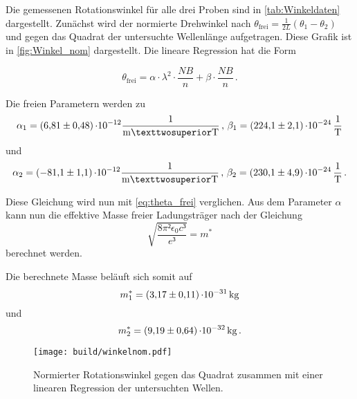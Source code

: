 Die gemessenen Rotationswinkel für alle drei Proben sind in \autoref{tab:Winkeldaten} dargestellt.
Zunächst wird der normierte Drehwinkel nach  $\theta_{\text{frei}} = \frac{1}{2 L}\left(\theta_1 - \theta_2\right)$ 
und gegen das Quadrat der untersuchte Wellenlänge aufgetragen.
Diese Grafik ist in \autoref{fig:Winkel_nom} dargestellt. 
Die lineare Regression hat die Form

\begin{equation*}
    \theta_{\text{frei}} = \alpha \cdot \lambda^2 \cdot \frac{N B}{n} + \beta \cdot \frac{N B}{n}\, .
\end{equation*}

Die freien Parametern werden zu %
\begin{equation*}
    \alpha_1 = \SI{6.81 \pm 0.48}\cdot 10^{-12} \unit{\frac{1}{\meter²\tesla}} \,, \, \beta_1 = \SI{224.1 \pm 2.1}\cdot 10^{-24} \, \unit{\frac{1}{\tesla}} \\ 
\end{equation*}
und
\begin{equation*}
    \alpha_2 = \SI{-81.1 \pm 1.1}\cdot 10^{-12} \unit{\frac{1}{\meter²\tesla}} \,, \,  \beta_2 = \SI{230.1  \pm 4.9}\cdot 10^{-24} \, \unit{\frac{1}{\tesla}}\, .  \\
\end{equation*}

Diese Gleichung wird nun mit \eqref{eq:theta_frei} verglichen.
Aus dem Parameter $\alpha$ kann nun die effektive Masse freier Ladungsträger nach der Gleichung
\begin{equation*}
    \sqrt{\frac{8 \pi² \epsilon_0 c³}{e³}} = m^*
\end{equation*} 
berechnet werden.

Die berechnete Masse beläuft sich somit auf 
\begin{equation*}
    m^*_1 = \SI{3.17 \pm 0.11}{\cdot 10^{-31}}\,\si{\kilo\gram}\, \\
\end{equation*}
und
\begin{equation*}
    m^*_2 = \SI{9.19 \pm 0.64}{\cdot 10^{-32}}\,\si{\kilo\gram} \,.   \\
\end{equation*}

\begin{figure}[H]
    \centering
    \texttt{[image: build/winkelnom.pdf]}
    \caption{Normierter Rotationswinkel gegen das Quadrat zusammen mit einer linearen Regression der untersuchten Wellen.}
    \label{fig:Winkel_nom}
\end{figure}


